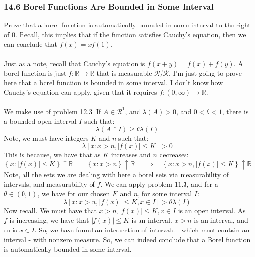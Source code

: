 \documentclass[12pt,a4paper]{article}
\newcommand{\1}[1]{\mathbbm{1}\left\{ #1 \right\}}
\newcommand{\R}{\mathbb{R}}
\newcommand{\rcal}{\mathcal{R}}
\begin{document}
\subsubsection{14.6 Borel Functions Are Bounded in Some Interval} Prove that a borel function is automatically bounded in some interval to the right of $0$. Recall, this implies that if the function satisfies Cauchy's equation, then we can conclude that $f(x) = xf(1)$.
\\\\
Just as a note, recall that Cauchy's equation is $f(x + y) = f(x) + f(y)$. A borel function is just $f: \R \to \R$ that is measurable $\rcal/\rcal$. I'm just going to prove here that a borel function is bounded in some interval. I don't know how Cauchy's equation can apply, given that it requires $f: (0,\infty) \to \R$.
\\\\
We make use of problem 12.3. If $A \in \rcal^1$, and $\lambda(A) > 0$, and $0 < \theta < 1$, there is a bounded open interval $I$ such that:
$$
	\lambda(A \cap I) \geq \theta\lambda(I)
$$
Note, we must have integers $K$ and $n$ such that:
$$
	\lambda\left[x : x > n, |f(x)| \leq K\right] > 0
$$
This is because, we have that as $K$ increases and $n$ decreases:
$$
	\left\{x : |f(x)| \leq K\right\} \uparrow \R \quad\quad
	\left\{x : x > n\right\} \uparrow \R \quad\implies\quad
	\left\{x : x > n, |f(x)| \leq K\right\} \uparrow \R
$$
Note, all the sets we are dealing with here a borel sets via measurability of intervals, and measurability of $f$. We can apply problem $11.3$, and for a $\theta \in (0,1)$, we have for our chosen $K$ and $n$, for some interval $I$:
$$
	\lambda\left[x : x > n, |f(x)| \leq K, x \in I\right] > \theta \lambda(I)
$$
Now recall. We must have that $x > n, |f(x)| \leq K, x \in I$ is an open interval. As $f$ is increasing, we have that $|f(x)| \leq K$ is an interval. $x > n$ is an interval, and so is $x \in I$. So, we have found an intersection of intervals - which must contain an interval - with nonzero measure. So, we can indeed conclude that a Borel function is automatically bounded in some interval.
\end{document}
